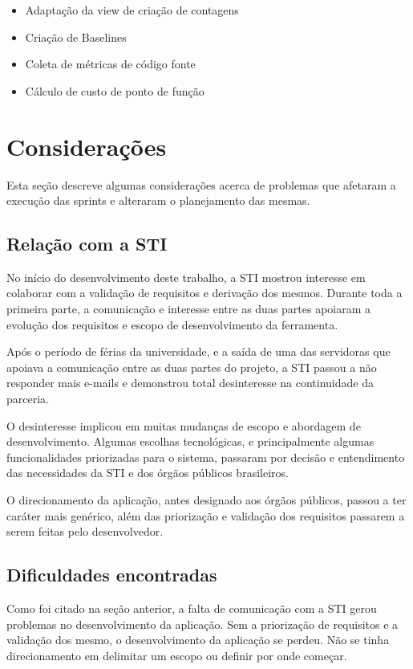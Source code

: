 \begin{itemize}
  \item Adaptação da view de criação de contagens
  \item Criação de Baselines
  \item Coleta de métricas de código fonte
  \item Cálculo de custo de ponto de função
\end{itemize}


\section{Considerações}

Esta seção descreve algumas considerações acerca de problemas que afetaram a execução das sprints e alteraram o planejamento das mesmas.

\subsection{Relação com a STI}

No início do desenvolvimento deste trabalho, a STI mostrou interesse em colaborar com a validação de requisitos e derivação dos mesmos. Durante toda a primeira parte, a comunicação e interesse entre as duas partes apoiaram a evolução dos requisitos e escopo de desenvolvimento da ferramenta.

Após o período de férias da universidade, e a saída de uma das servidoras que apoiava a comunicação entre as duas partes do projeto, a STI passou a não responder mais e-mails e demonstrou total desinteresse na continuidade da parceria.

O desinteresse implicou em muitas mudanças de escopo e abordagem de desenvolvimento. Algumas escolhas tecnológicas, e principalmente algumas funcionalidades priorizadas para o sistema, passaram por decisão e entendimento das necessidades da STI e dos órgãos públicos brasileiros.

O direcionamento da aplicação, antes designado aos órgãos públicos, passou a ter caráter mais genérico, além das priorização e validação dos requisitos passarem a serem feitas pelo desenvolvedor.

\subsection{Dificuldades encontradas}

Como foi citado na seção anterior, a falta de comunicação com a STI gerou problemas no desenvolvimento da aplicação. Sem a priorização de requisitos e a validação dos mesmo, o desenvolvimento da aplicação se perdeu. Não se tinha direcionamento em delimitar um escopo ou definir por onde começar.

